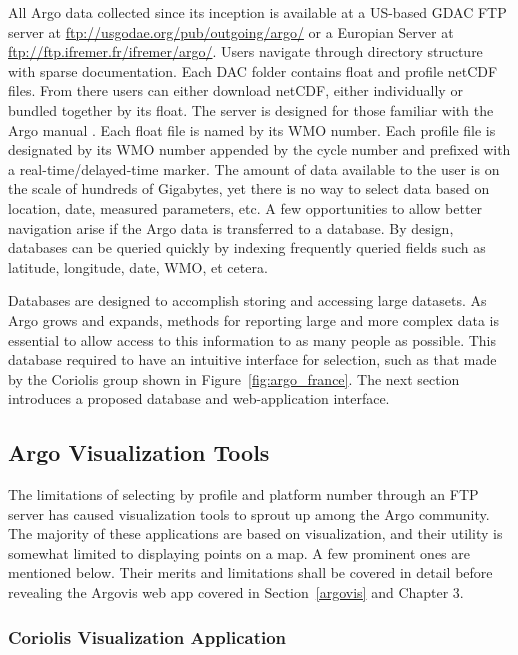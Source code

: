 All Argo data collected since its inception is available at a US-based GDAC FTP server at \url{ftp://usgodae.org/pub/outgoing/argo/} or a Europian Server at \url{ftp://ftp.ifremer.fr/ifremer/argo/}. Users navigate through directory structure with sparse documentation. Each DAC folder contains float and profile netCDF files. From there users can either download netCDF, either individually or bundled together by its float. The server is designed for those familiar with the Argo manual \cite{argo_man}. Each float file is named by its WMO number. Each profile file is designated by its WMO number appended by the cycle number and prefixed with a real-time/delayed-time marker. The amount of data available to the user is on the scale of hundreds of Gigabytes, yet there is no way to select data based on location, date, measured parameters, etc. A few opportunities to allow better navigation arise if the Argo data is transferred to a database. By design, databases can be queried quickly by indexing frequently queried fields such as latitude, longitude, date, WMO, et cetera.

Databases are designed to accomplish storing and accessing large datasets. As Argo grows and expands, methods for reporting large and more complex data is essential to allow access to this information to as many people as possible. This database required to have an intuitive interface for selection, such as that made by the Coriolis group shown in Figure~\ref{fig:argo_france}. The next section introduces a proposed database and web-application interface.

\subsection{Argo Visualization Tools}

The limitations of selecting by profile and platform number through an FTP server has caused visualization tools to sprout up among the Argo community. The majority of these applications are based on visualization, and their utility is somewhat limited to displaying points on a map. A few prominent ones are mentioned below. Their merits and limitations shall be covered in detail before revealing the Argovis web app covered in Section~\ref{argovis} and Chapter 3.

\subsubsection{Coriolis Visualization Application} \label{coriolis}

